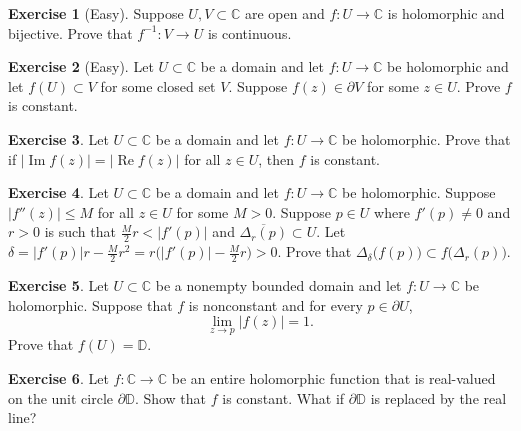 \documentclass[12pt,openany]{book}
\renewcommand{\Re}{\operatorname{Re}}
\renewcommand{\Im}{\operatorname{Im}}
\newcommand{\sabs}[1]{\lvert {#1} \rvert}
\newcommand{\abs}[1]{\left\lvert {#1} \right\rvert}
\newcommand{\C}{{\mathbb{C}}}
\newcommand{\D}{{\mathbb{D}}}
\theoremstyle{plain}
\theoremstyle{remark}
\theoremstyle{definition}
\newenvironment{exbox}{%
    \def\FrameCommand{\vrule width 1pt \relax\hspace{10pt}}%
    \MakeFramed{\advance\hsize-\width\FrameRestore}%
}{%
    \endMakeFramed
}
\theoremstyle{exercise}
\newtheorem{exercise}{Exercise}[section]
\theoremstyle{example}
\begin{document}
\begin{exbox}
\begin{exercise}[Easy]
Suppose $U,V \subset \C$ are open and $f \colon U \to \C$ is holomorphic
and bijective.  Prove that $f^{-1} \colon V \to U$ is continuous.
\end{exercise}

\begin{exercise}[Easy]
Let $U \subset \C$ be a domain and let $f \colon U \to \C$ be holomorphic
and let $f(U) \subset V$ for some closed set $V$.
Suppose $f(z) \in \partial V$
for some $z \in U$.  Prove $f$ is constant.
\end{exercise}

\begin{exercise}
Let $U \subset \C$ be a domain and let $f \colon U \to \C$ be holomorphic.
Prove that if $\abs{\Im f(z)} = \abs{\Re f(z)}$
for all $z \in U$,
then $f$ is constant.
\end{exercise}

\begin{exercise}
Let $U \subset \C$ be a domain and let $f \colon U \to \C$ be holomorphic.
Suppose $\sabs{f''(z)} \leq M$ for all $z \in U$ for some $M > 0$.
Suppose $p \in U$ where $f'(p) \not= 0$ and $r > 0$ is such that
$\frac{M}{2}r < \sabs{f'(p)}$ and $\overline{\Delta_r(p)} \subset U$.
Let $\delta = \sabs{f'(p)}r - \frac{M}{2} r^2
= r\bigl(\sabs{f'(p)} - \frac{M}{2} r\bigr) > 0$.  Prove that
$\Delta_{\delta}\bigl(f(p)\bigr) \subset f\bigl( \Delta_r(p) \bigr)$.
\end{exercise}

\begin{exercise}
Let $U \subset \C$ be a nonempty bounded domain and
let $f \colon U \to \C$ be holomorphic.
Suppose that $f$ is nonconstant and for every $p \in \partial U$,
\begin{equation*}
\lim_{z \to p} \abs{f(z)}=1 .
\end{equation*}
Prove that $f(U) = \D$.
\end{exercise}

\begin{exercise}
Let $f \colon \C \to \C$ be an entire holomorphic function 
that is real-valued on the unit circle $\partial \D$.  Show that $f$ is
constant.  What if $\partial \D$ is replaced by the real line?
\end{exercise}
\end{exbox}



\end{document}

